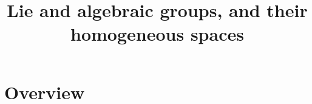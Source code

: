 

%


\title{Lie and algebraic groups, and their homogeneous spaces}


\maketitle

\label{section-phantom}

\tableofcontents


\section{Overview}
\label{section-overview}

\noindent









